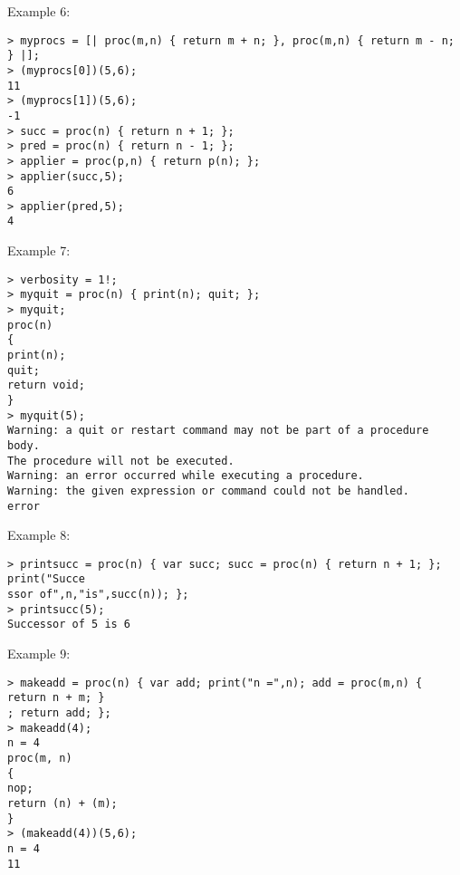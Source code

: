 \noindent Example 6: 
\begin{center}\begin{minipage}{15cm}\begin{Verbatim}[frame=single,commandchars=\\\|\~]
> myprocs = [| proc(m,n) { return m + n; }, proc(m,n) { return m - n; } |];
> (myprocs[0])(5,6);
11
> (myprocs[1])(5,6);
-1
> succ = proc(n) { return n + 1; };
> pred = proc(n) { return n - 1; };
> applier = proc(p,n) { return p(n); };
> applier(succ,5);
6
> applier(pred,5);
4
\end{Verbatim}
\end{minipage}\end{center}
\noindent Example 7: 
\begin{center}\begin{minipage}{15cm}\begin{Verbatim}[frame=single,commandchars=\\\|\~]
> verbosity = 1!;
> myquit = proc(n) { print(n); quit; };
> myquit;
proc(n)
{
print(n);
quit;
return void;
}
> myquit(5);
Warning: a quit or restart command may not be part of a procedure body.
The procedure will not be executed.
Warning: an error occurred while executing a procedure.
Warning: the given expression or command could not be handled.
error
\end{Verbatim}
\end{minipage}\end{center}
\noindent Example 8: 
\begin{center}\begin{minipage}{15cm}\begin{Verbatim}[frame=single,commandchars=\\\|\~]
> printsucc = proc(n) { var succ; succ = proc(n) { return n + 1; }; print("Succe
ssor of",n,"is",succ(n)); };
> printsucc(5);
Successor of 5 is 6
\end{Verbatim}
\end{minipage}\end{center}
\noindent Example 9: 
\begin{center}\begin{minipage}{15cm}\begin{Verbatim}[frame=single,commandchars=\\\|\~]
> makeadd = proc(n) { var add; print("n =",n); add = proc(m,n) { return n + m; }
; return add; };
> makeadd(4);
n = 4
proc(m, n)
{
nop;
return (n) + (m);
}
> (makeadd(4))(5,6);
n = 4
11
\end{Verbatim}
\end{minipage}\end{center}
